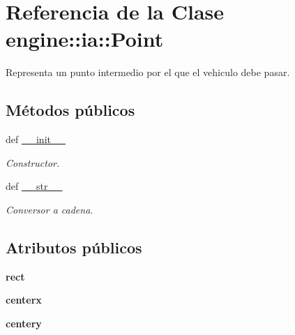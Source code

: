 \hypertarget{classengine_1_1ia_1_1Point}{
\section{\-Referencia de la \-Clase engine\-:\-:ia\-:\-:\-Point}
\label{classengine_1_1ia_1_1Point}
}


\-Representa un punto intermedio por el que el vehiculo debe pasar.  


\subsection*{\-Métodos públicos}
\begin{DoxyCompactItemize}
\item 
def \hyperlink{classengine_1_1ia_1_1Point_ab8f8e8b9671d69df41bbb6dc28588f6b}{\-\_\-\-\_\-init\-\_\-\-\_\-}
\begin{DoxyCompactList}\small\item\em \-Constructor. \end{DoxyCompactList}\item 
\hypertarget{classengine_1_1ia_1_1Point_a936fe50d2b5095ad05059645aaa74107}{
def \hyperlink{classengine_1_1ia_1_1Point_a936fe50d2b5095ad05059645aaa74107}{\-\_\-\-\_\-str\-\_\-\-\_\-}}
\label{classengine_1_1ia_1_1Point_a936fe50d2b5095ad05059645aaa74107}

\begin{DoxyCompactList}\small\item\em \-Conversor a cadena. \end{DoxyCompactList}\end{DoxyCompactItemize}
\subsection*{\-Atributos públicos}
\begin{DoxyCompactItemize}
\item 
\hypertarget{classengine_1_1ia_1_1Point_a2f00d1a6daa26fd423e66f6c126654ee}{
{\bfseries rect}}
\label{classengine_1_1ia_1_1Point_a2f00d1a6daa26fd423e66f6c126654ee}

\item 
\hypertarget{classengine_1_1ia_1_1Point_a70152c4401a90c1952511bd5091c4834}{
{\bfseries centerx}}
\label{classengine_1_1ia_1_1Point_a70152c4401a90c1952511bd5091c4834}

\item 
\hypertarget{classengine_1_1ia_1_1Point_a162ffda70b43cb8eb3343fa6a5fa7ec5}{
{\bfseries centery}}
\label{classengine_1_1ia_1_1Point_a162ffda70b43cb8eb3343fa6a5fa7ec5}

\end{DoxyCompactItemize}


